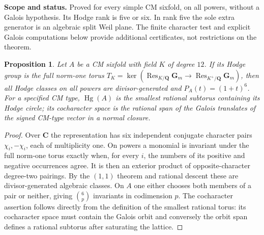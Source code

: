 \documentclass[11pt,reqno]{article}
\theoremstyle{emphasizedplain}
\newtheorem{proposition}[theorem]{Proposition}
\theoremstyle{emphasizeddefinition}
\theoremstyle{emphasizeddefinition}
\DeclareMathOperator{\Hg}{Hg}
\DeclareMathOperator{\Res}{Res}
\newcommand{\Q}{\mathbf Q}
\newcommand{\C}{\mathbf C}
\newcommand{\status}[1]{%
  \par\nobreak\smallskip\noindent
  {\setlength{\fboxsep}{7pt}%
   \colorbox{ScopeBackground}{%
    \parbox{\dimexpr\linewidth-2\fboxsep\relax}{%
     \small\textbf{\textcolor{HeadingInk}{Scope and status.}} #1}}}%
  \par\nobreak\medskip}
\begin{document}
\status{Proved for every simple CM sixfold, on all powers, without
a Galois hypothesis. Its Hodge rank is five or six. In rank five the
sole extra generator is an algebraic split Weil plane. The finite
character test and explicit Galois computations below provide additional
certificates, not restrictions on the theorem.}
\begin{proposition}\label{t:CM}
Let $A$ be a CM sixfold with field $K$ of degree $12$. If its Hodge group
is the full norm-one torus
$T_K=\ker(\Res_{K/\Q}\mathbf G_m\to\Res_{K^+/\Q}\mathbf G_m)$,
then all Hodge classes on all powers are divisor-generated and
$P_A(t)=(1+t)^6$.
For a specified CM type, $\Hg(A)$ is the smallest rational subtorus
containing its Hodge circle; its cocharacter space is the rational span of
the Galois translates of the signed CM-type vector in a normal closure.
\end{proposition}
\begin{proof}
Over $\C$ the representation has six independent conjugate character
pairs $\chi_i,-\chi_i$, each of multiplicity one. On powers a monomial
is invariant under the full norm-one torus exactly when, for every $i$,
the numbers of its positive and negative occurrences agree. It is then
an exterior product of opposite-character degree-two pairings.
By the $(1,1)$ theorem and rational descent these are divisor-generated
algebraic classes. On $A$ one either chooses both members of a pair or
neither, giving $\binom6p$ invariants in codimension $p$.
The cocharacter assertion follows directly from the definition of the
smallest rational torus: its cocharacter space must contain the Galois
orbit and conversely the orbit span defines a rational subtorus after
saturating the lattice.
\end{proof}
\end{document}
